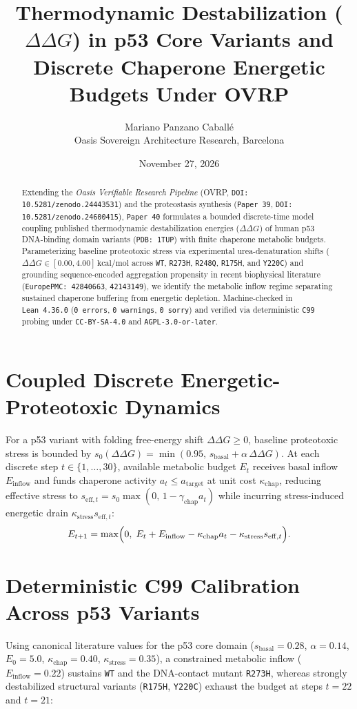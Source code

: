 \documentclass[11pt,a4paper]{article}
\title{Thermodynamic Destabilization ($\Delta\Delta G$) in p53 Core Variants and Discrete Chaperone Energetic Budgets Under OVRP}
\author{Mariano Panzano Caball\'e \\ \small Oasis Sovereign Architecture Research, Barcelona}
\date{November 27, 2026}
\begin{document}
\maketitle

\begin{abstract}
Extending the \emph{Oasis Verifiable Research Pipeline} (OVRP, \texttt{DOI: 10.5281/zenodo.24443531}) and the proteostasis synthesis (\texttt{Paper~39}, \texttt{DOI: 10.5281/zenodo.24600415}), \texttt{Paper~40} formulates a bounded discrete-time model coupling published thermodynamic destabilization energies ($\Delta\Delta G$) of human p53 DNA-binding domain variants (\texttt{PDB: 1TUP}) with finite chaperone metabolic budgets. Parameterizing baseline proteotoxic stress via experimental urea-denaturation shifts ($\Delta\Delta G \in [0.00, 4.00]\,\mathrm{kcal/mol}$ across \texttt{WT}, \texttt{R273H}, \texttt{R248Q}, \texttt{R175H}, and \texttt{Y220C}) and grounding sequence-encoded aggregation propensity in recent biophysical literature (\texttt{EuropePMC: 42840663}, \texttt{42143149}), we identify the metabolic inflow regime separating sustained chaperone buffering from energetic depletion. Machine-checked in \texttt{Lean~4.36.0} (\texttt{0~errors}, \texttt{0~warnings}, \texttt{0~sorry}) and verified via deterministic \texttt{C99} probing under \texttt{CC-BY-SA-4.0} and \texttt{AGPL-3.0-or-later}.
\end{abstract}

\section{Coupled Discrete Energetic-Proteotoxic Dynamics}
For a p53 variant with folding free-energy shift $\Delta\Delta G \ge 0$, baseline proteotoxic stress is bounded by $s_0(\Delta\Delta G) = \min(0.95,\, s_{\mathrm{basal}} + \alpha\,\Delta\Delta G)$. At each discrete step $t \in \{1,\dots,30\}$, available metabolic budget $E_t$ receives basal inflow $E_{\mathrm{inflow}}$ and funds chaperone activity $a_t \le a_{\mathrm{target}}$ at unit cost $\kappa_{\mathrm{chap}}$, reducing effective stress to $s_{\mathrm{eff},t} = s_0\max(0,\, 1 - \gamma_{\mathrm{chap}} a_t)$ while incurring stress-induced energetic drain $\kappa_{\mathrm{stress}} s_{\mathrm{eff},t}$:
\begin{equation}
E_{t+1} = \max\Bigl(0,\; E_t + E_{\mathrm{inflow}} - \kappa_{\mathrm{chap}} a_t - \kappa_{\mathrm{stress}} s_{\mathrm{eff},t}\Bigr).
\end{equation}

\section{Deterministic C99 Calibration Across p53 Variants}
Using canonical literature values for the p53 core domain ($s_{\mathrm{basal}} = 0.28$, $\alpha = 0.14$, $E_0 = 5.0$, $\kappa_{\mathrm{chap}} = 0.40$, $\kappa_{\mathrm{stress}} = 0.35$), a constrained metabolic inflow ($E_{\mathrm{inflow}} = 0.22$) sustains \texttt{WT} and the DNA-contact mutant \texttt{R273H}, whereas strongly destabilized structural variants (\texttt{R175H}, \texttt{Y220C}) exhaust the budget at steps $t=22$ and $t=21$:
\end{document}
